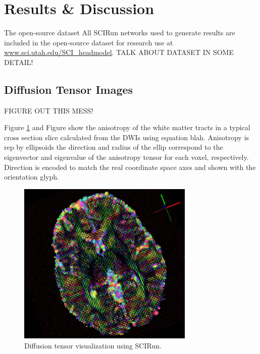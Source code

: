 %

\section{Results \& Discussion}
\label{sec:results}

The open-source dataset
All SCIRun networks used to generate results are included in the open-source dataset for research use at \url{www.sci.utah.edu/SCI_headmodel}. TALK ABOUT DATASET IN SOME DETAIL!


\subsection{Diffusion Tensor Images}

FIGURE OUT THIS MESS!

Figure \ref{fig:tensorvis} and Figure show the anisotropy of the white matter tracts in a typical cross section slice calculated from the DWIs using equation blah. Anisotropy is rep by ellipsoids the direction and radius of the ellip correspond to the eigenvector and eigenvalue of the anisotropy tensor for each voxel, respectively. Direction is encoded to match the real coordinate space axes and shown with the orientation glyph. 

\begin{figure}[H]
\begin{center}
\includegraphics[width=0.75\textwidth]{Figures/DTI_1.png}
\caption{Diffusion tensor visualization using SCIRun.}
\label{fig:tensorvis}
\end{center}
\end{figure}

